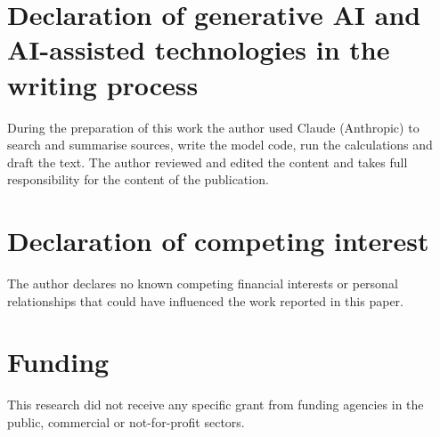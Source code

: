 \documentclass[11pt,a4paper]{article}
\begin{document}
\section*{Declaration of generative AI and AI-assisted technologies in the writing process}
During the preparation of this work the author used Claude (Anthropic) to search and summarise sources, write the model code, run the calculations and draft the text. The author reviewed and edited the content and takes full responsibility for the content of the publication.

\section*{Declaration of competing interest}
The author declares no known competing financial interests or personal relationships that could have influenced the work reported in this paper.

\section*{Funding}
This research did not receive any specific grant from funding agencies in the public, commercial or not-for-profit sectors.

\FloatBarrier

\clearpage



\end{document}
